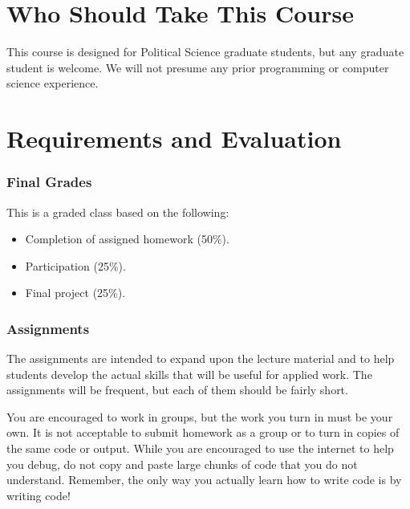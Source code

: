 \documentclass[
]{book}
\providecommand{\tightlist}{%
  \setlength{\itemsep}{0pt}\setlength{\parskip}{0pt}}
\begin{document}
\hypertarget{who-should-take-this-course}{%
\section{Who Should Take This Course}\label{who-should-take-this-course}}

This course is designed for Political Science graduate students, but any graduate student is welcome. We will not presume any prior programming or computer science experience.

\hypertarget{requirements-and-evaluation}{%
\section{Requirements and Evaluation}\label{requirements-and-evaluation}}

\hypertarget{final-grades}{%
\subsubsection*{Final Grades}\label{final-grades}}

This is a graded class based on the following:

\begin{itemize}
\tightlist
\item
  Completion of assigned homework (50\%).
\item
  Participation (25\%).
\item
  Final project (25\%).
\end{itemize}

\hypertarget{assignments}{%
\subsubsection*{Assignments}\label{assignments}}

The assignments are intended to expand upon the lecture material and to help students develop the actual skills that will be useful for applied work. The assignments will be frequent, but each of them should be fairly short.

You are encouraged to work in groups, but the work you turn in must be your own. It is not acceptable to submit homework as a group or to turn in copies of the same code or output. While you are encouraged to use the internet to help you debug, do not copy and paste large chunks of code that you do not understand. Remember, the only way you actually learn how to write code is by writing code!
\end{document}
